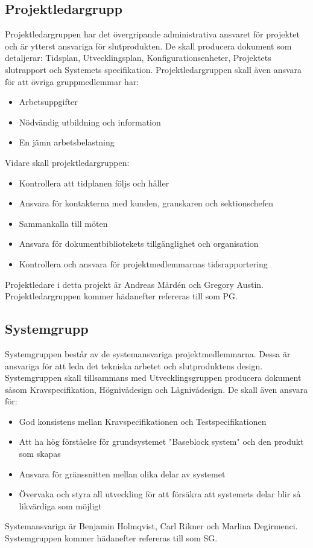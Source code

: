 \documentclass[paper=a4, fontsize=11pt,twoside]{article}
\begin{document}
\subsection*{Projektledargrupp}
Projektledargruppen har det övergripande administrativa ansvaret för projektet och är ytterst ansvariga för slutprodukten. De skall producera dokument som detaljerar: Tidsplan, Utvecklingsplan, Konfigurationsenheter, Projektets slutrapport och Systemets specifikation.
Projektledargruppen skall även ansvara för att övriga gruppmedlemmar har:
\begin{itemize}
\item Arbetsuppgifter
\item Nödvändig utbildning och  information
\item En jämn arbetsbelastning
\end{itemize}
Vidare skall projektledargruppen:	
\begin{itemize}	 
\item Kontrollera att tidplanen följs och håller
\item Ansvara för kontakterna med kunden, granskaren och sektionschefen
\item Sammankalla till möten
\item Ansvara för dokumentbibliotekets tillgänglighet och organisation
\item Kontrollera och ansvara för projektmedlemmarnas tidsrapportering
\end{itemize}
Projektledare i detta projekt är Andreas Mårdén och Gregory Austin.	
Projektledargruppen kommer hädanefter refereras till som PG.


\subsection*{Systemgrupp}
Systemgruppen består av de systemansvariga projektmedlemmarna. Dessa är ansvariga för att leda det tekniska arbetet och slutproduktens design. Systemgruppen skall tillsammans med Utvecklingsgruppen producera dokument såsom Kravspecifikation, Högnivådesign och Lågnivådesign. 
De skall även ansvara för: 
\begin{itemize}
\item God konsistens mellan Kravspecifikationen och Testspecifikationen 
\item Att ha hög förståelse för grundsystemet "Baseblock system" och den produkt som skapas	 
\item Ansvara för gränssnitten mellan olika delar av systemet
\item Övervaka och styra all utveckling för att försäkra att systemets delar blir så likvärdiga som möjligt
\end{itemize}
Systemansvariga är Benjamin Holmqvist, Carl Rikner och Marlina Degirmenci. 
Systemgruppen kommer hädanefter refereras till som SG.
\end{document}
